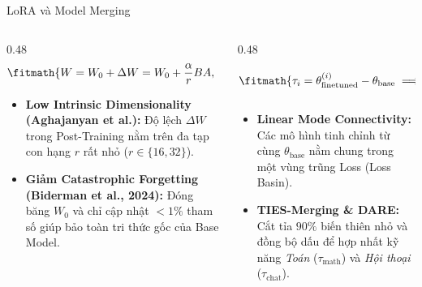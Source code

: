 \begin{frame}{LoRA và Model Merging}
  \begin{columns}[T,onlytextwidth]
    \begin{column}{0.48\textwidth}
      \small
      \[
        \fitmath{%
        W = W_0 + \Delta W = W_0 + \frac{\alpha}{r} B A, \quad r \ll \min(d, k)
        }
      \]
      \begin{itemize}\setlength{\itemsep}{2pt}
        \item \textbf{Low Intrinsic Dimensionality (Aghajanyan et al.):} Độ lệch $\Delta W$ trong Post-Training nằm trên đa tạp con hạng $r$ rất nhỏ ($r \in \{16, 32\}$).
        \item \textbf{Giảm Catastrophic Forgetting (Biderman et al., 2024):} Đóng băng $W_0$ và chỉ cập nhật $<1\%$ tham số giúp bảo toàn tri thức gốc của Base Model.
      \end{itemize}
    \end{column}
    \begin{column}{0.48\textwidth}
      \small
      \[
        \fitmath{%
        \tau_i = \theta_{\text{finetuned}}^{(i)} - \theta_{\text{base}} \implies \theta_{\text{merged}} = \theta_{\text{base}} + \sum_{i=1}^{M} \lambda_i \tau_i
        }
      \]
      \begin{itemize}\setlength{\itemsep}{2pt}
        \item \textbf{Linear Mode Connectivity:} Các mô hình tinh chỉnh từ cùng $\theta_{\text{base}}$ nằm chung trong một vùng trũng Loss (Loss Basin).
        \item \textbf{TIES-Merging \& DARE:} Cắt tỉa $90\%$ biến thiên nhỏ và đồng bộ dấu để hợp nhất kỹ năng \textit{Toán} ($\tau_{\text{math}}$) và \textit{Hội thoại} ($\tau_{\text{chat}}$).
      \end{itemize}
    \end{column}
  \end{columns}
  \par\vspace{0pt}
\end{frame}

